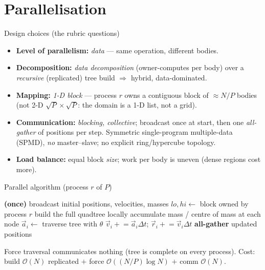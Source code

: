 \documentclass[aspectratio=169]{beamer}
\begin{document}
\section{Parallelisation}
\begin{frame}{Design choices (the rubric questions)}
\begin{itemize}
  \item \textbf{Level of parallelism:} \emph{data} --- same operation, different
        bodies.
  \item \textbf{Decomposition:} \emph{data decomposition} (owner-computes per
        body) over a \emph{recursive} (replicated) tree build $\Rightarrow$
        hybrid, data-dominated.
  \item \textbf{Mapping:} \emph{1-D block} --- process $r$ owns a contiguous block
        of $\approx N/P$ bodies (not 2-D $\sqrt{P}\times\sqrt{P}$: the domain is a
        1-D list, not a grid).
  \item \textbf{Communication:} \emph{blocking, collective}; broadcast once at
        start, then one \emph{all-gather} of positions per step. Symmetric
        single-program multiple-data (SPMD),
        \emph{no} master--slave; no explicit ring/hypercube topology.
  \item \textbf{Load balance:} equal block \emph{size}; work per body is uneven
        (dense regions cost more).
\end{itemize}
\end{frame}

\begin{frame}{Parallel algorithm (process $r$ of $P$)}
\begin{algorithmic}[1]
\State \textbf{(once)} broadcast initial positions, velocities, masses
\State $lo,hi \gets$ block owned by process $r$ 
  \State build the full quadtree locally 
  \State accumulate mass / centre of mass at each node
   
     \State $\vec a_i \gets$ traverse tree with $\theta$
  \EndFor
  \State $\vec v_i \mathrel{+}= \vec a_i\Delta t$; \; $\vec r_i \mathrel{+}= \vec v_i\Delta t$
  \State \textbf{all-gather} updated positions
\EndFor
\end{algorithmic}
\vspace{4pt}
\footnotesize Force traversal communicates nothing (tree is complete on every
process). Cost: build $\mathcal{O}(N)$ replicated $+$ force
$\mathcal{O}((N/P)\log N)$ $+$ comm $\mathcal{O}(N)$.
\end{frame}
\end{document}
